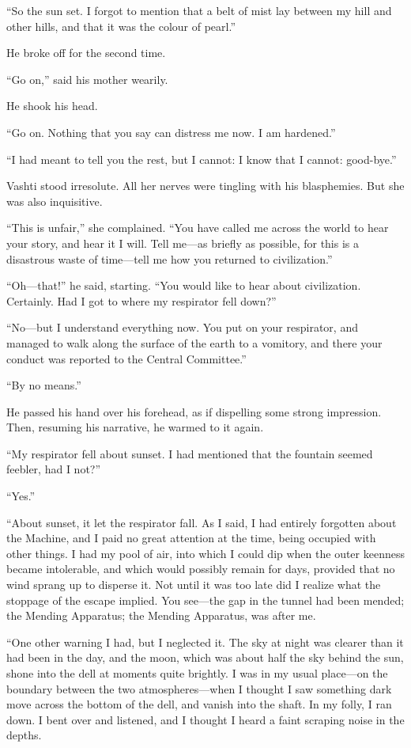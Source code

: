 ``So the sun set. I forgot to mention that a belt of mist lay between my hill and other hills, and that it was the colour of pearl.''

He broke off for the second time.

``Go on,'' said his mother wearily.

He shook his head.

``Go on. Nothing that you say can distress me now. I am hardened.''

``I had meant to tell you the rest, but I cannot: I know that I cannot: good-bye.''

Vashti stood irresolute. All her nerves were tingling with his blasphemies. But she was also inquisitive.

``This is unfair,'' she complained. ``You have called me across the world to hear your story, and hear it I will. Tell me---as briefly as possible, for this is a disastrous waste of time---tell me how you returned to civilization.''

``Oh---that!'' he said, starting. ``You would like to hear about civilization. Certainly. Had I got to where my respirator fell down?''

``No---but I understand everything now. You put on your respirator, and managed to walk along the surface of the earth to a vomitory, and there your conduct was reported to the Central Committee.''

``By no means.''

He passed his hand over his forehead, as if dispelling some strong impression. Then, resuming his narrative, he warmed to it again.

``My respirator fell about sunset. I had mentioned that the fountain seemed feebler, had I not?''

``Yes.''

``About sunset, it let the respirator fall. As I said, I had entirely forgotten about the Machine, and I paid no great attention at the time, being occupied with other things. I had my pool of air, into which I could dip when the outer keenness became intolerable, and which would possibly remain for days, provided that no wind sprang up to disperse it. Not until it was too late did I realize what the stoppage of the escape implied. You see---the gap in the tunnel had been mended; the Mending Apparatus; the Mending Apparatus, was after me.

``One other warning I had, but I neglected it. The sky at night was clearer than it had been in the day, and the moon, which was about half the sky behind the sun, shone into the dell at moments quite brightly. I was in my usual place---on the boundary between the two atmospheres---when I thought I saw something dark move across the bottom of the dell, and vanish into the shaft. In my folly, I ran down. I bent over and listened, and I thought I heard a faint scraping noise in the depths.

